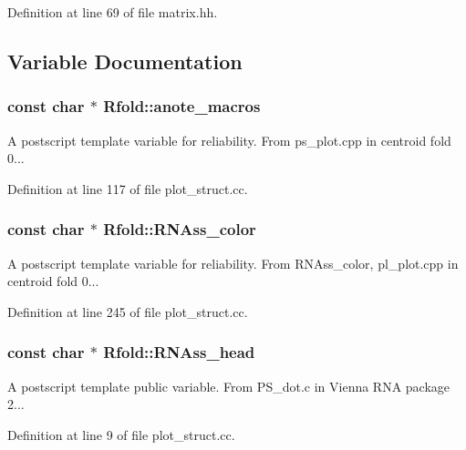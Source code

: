 Definition at line 69 of file matrix.\+hh.



\subsection{Variable Documentation}
\hypertarget{namespace_rfold_a021c8cd72fb29fa8491544b7eb90110e}{
\subsubsection[{anote\+\_\+macros}]{\setlength{\rightskip}{0pt plus 5cm}const char $\ast$ Rfold\+::anote\+\_\+macros}}\label{namespace_rfold_a021c8cd72fb29fa8491544b7eb90110e}
A postscript template variable for reliability. From ps\+\_\+plot.\+cpp in centroid fold 0... 

Definition at line 117 of file plot\+\_\+struct.\+cc.

\hypertarget{namespace_rfold_a932e8cd670479c52a8d791ec7377ff87}{
\subsubsection[{R\+N\+Ass\+\_\+color}]{\setlength{\rightskip}{0pt plus 5cm}const char $\ast$ Rfold\+::\+R\+N\+Ass\+\_\+color}}\label{namespace_rfold_a932e8cd670479c52a8d791ec7377ff87}
A postscript template variable for reliability. From R\+N\+Ass\+\_\+color, pl\+\_\+plot.\+cpp in centroid fold 0... 

Definition at line 245 of file plot\+\_\+struct.\+cc.

\hypertarget{namespace_rfold_ab54ee07a82c4554e95d1149302e034a8}{
\subsubsection[{R\+N\+Ass\+\_\+head}]{\setlength{\rightskip}{0pt plus 5cm}const char $\ast$ Rfold\+::\+R\+N\+Ass\+\_\+head}}\label{namespace_rfold_ab54ee07a82c4554e95d1149302e034a8}
A postscript template public variable. From P\+S\+\_\+dot.\+c in Vienna R\+N\+A package 2... 

Definition at line 9 of file plot\+\_\+struct.\+cc.

